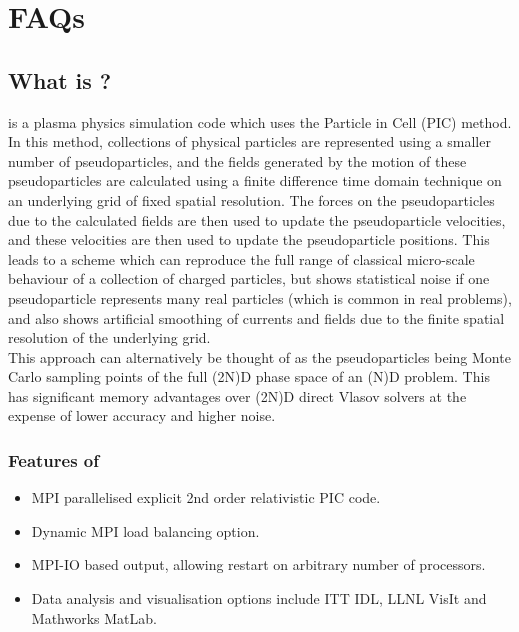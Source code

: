 \documentclass[12pt,a4paper]{article}
\newcommand{\EPOCH}{{\color{warwickdark}\fontfamily{phv}\selectfont{EPOCH}}}
\begin{document}
{
  \selectfont
}
\selectfont%
\tableofcontents%
\newpage%
\DefineShortVerb{\#}
\section{FAQs}

\subsection{What is {\EPOCH}?}
{\EPOCH} is a plasma physics simulation code which uses the Particle in Cell
(PIC) method. In this method, collections of physical particles are represented
using a smaller number of pseudoparticles, and the fields generated by the
motion of these pseudoparticles are calculated using a finite difference time
domain technique on an underlying grid of fixed spatial resolution. The forces
on the pseudoparticles due to the calculated fields are then used to update the
pseudoparticle velocities, and these velocities are then used to update the
pseudoparticle positions. This leads to a scheme which can reproduce the full
range of classical micro-scale behaviour of a collection of charged particles,
but shows statistical noise if one pseudoparticle represents many real
particles (which is common in real problems), and also shows artificial
smoothing of currents and fields due to the finite spatial resolution of the
underlying grid.\\

This approach can alternatively be thought of as the pseudoparticles being
Monte Carlo sampling points of the full (2N)D phase space of an (N)D
problem. This has significant memory advantages over (2N)D direct Vlasov
solvers at the expense of lower accuracy and higher noise.

\subsubsection{Features of {\EPOCH}}
\begin{itemize}
  \item MPI parallelised explicit 2nd order relativistic PIC code.
  \item Dynamic MPI load balancing option.
  \item MPI-IO based output, allowing restart on arbitrary number of processors.
  \item Data analysis and visualisation options include ITT IDL, LLNL VisIt
    and Mathworks MatLab.
\end{itemize}
\end{document}
